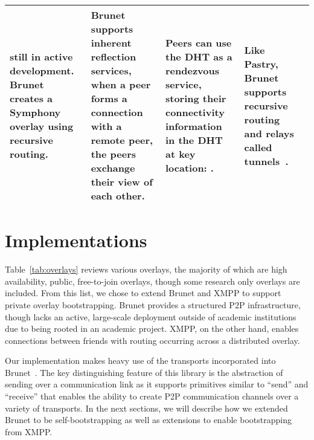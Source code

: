 \documentclass[conference]{IEEEtran}
\begin{document}
\begin{table*}[h!t!]
\begin{tabular}[c]{|m{1.5cm}||m{5.5cm}|m{3cm}|m{3cm}|m{3cm}|}
still in active development.  Brunet creates a Symphony~\cite{symphony} overlay
using recursive routing.
&
Brunet supports inherent reflection services, when a peer forms a connection
with a remote peer, the peers exchange their view of each other.
&
Peers can use the DHT as a rendezvous service, storing their connectivity
information in the DHT at key location:  .
&
Like Pastry, Brunet supports recursive routing and relays called
tunnels~\cite{hpdc08_0}.
\\ \hline
\end{tabular}
\caption{Public and Research Overlays}
\label{tab:overlays}
\end{table*}

\section{Implementations}
\label{implementation}

Table~\ref{tab:overlays} reviews various overlays, the majority of which are
high availability, public, free-to-join overlays, though some research only
overlays are included.  From this list, we chose to extend Brunet and XMPP
to support private overlay bootstrapping.  Brunet provides a structured P2P
infrastructure, though lacks an active, large-scale deployment outside of
academic institutions due to being rooted in an academic project.  XMPP, on the
other hand, enables connections between friends with routing occurring across a
distributed overlay.

Our implementation makes heavy use of the transports incorporated into
Brunet~\cite{brunet}.  The key distinguishing feature of this library is the
abstraction of sending over a communication link as it supports primitives
similar to ``send'' and ``receive'' that enables the ability to create P2P
communication channels over a variety of transports.  In the next sections, we
will describe how we extended Brunet to be self-bootstrapping as well as
extensions to enable bootstrapping from XMPP.
\end{document}
